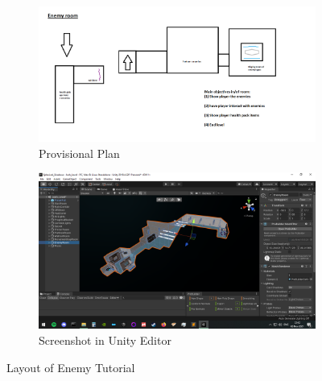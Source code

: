 \begin{figure}[H]
\centering
\begin{subfigure}{0.5\textwidth}
  \centering
  \includegraphics[width=1\linewidth]{Figures/enemyplan.png}
  \caption{Provisional Plan}
\end{subfigure}%
\begin{subfigure}{0.5\textwidth}
  \centering
  \includegraphics[width=1\linewidth]{Figures/enemy.png}
  \caption{Screenshot in Unity Editor}
\end{subfigure}
\caption{Layout of Enemy Tutorial}
\end{figure}
